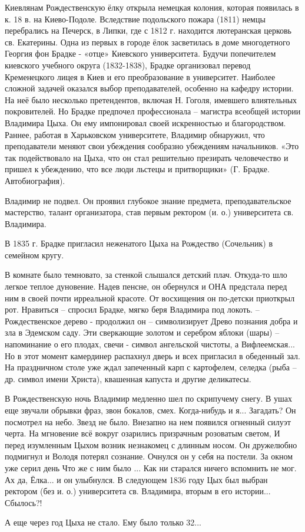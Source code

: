 Киевлянам Рождественскую ёлку открыла немецкая колония, которая появилась в к.
18 в. на Киево-Подоле. Вследствие подольского пожара (1811) немцы перебрались
на Печерск, в Липки, где с 1812 г. находится лютеранская церковь св. Екатерины.
Одна из первых в городе ёлок засветилась в доме многодетного Георгия фон Брадке
-  «отце» Киевского университета. Будучи попечителем киевского учебного округа
(1832-1838), Брадке организовал перевод Кременецкого лицея в Киев и его
преобразование в университет. Наиболее сложной задачей оказался выбор
преподавателей, особенно на кафедру истории. На неё было несколько
претендентов, включая Н. Гоголя, имевшего влиятельных покровителей. Но Брадке
предпочел профессионала – магистра всеобщей истории Владимира Цыха. Он ему
импонировал своей искренностью и благородством. Раннее, работая в Харьковском
университете, Владимир обнаружил, что преподаватели меняют свои убеждения
сообразно убеждениям начальников. «Это так подействовало на Цыха, что он стал
решительно презирать человечество и пришел к убеждению, что все люди льстецы и
притворщики» (Г. Брадке. Автобиография). 

Владимир не подвел. Он проявил глубокое знание предмета, преподавательское
мастерство, талант организатора, став первым ректором (и. о.) университета св.
Владимира. 

В 1835 г.  Брадке пригласил неженатого Цыха на Рождество (Сочельник) в семейном
кругу.

В комнате было темновато, за стенкой слышался детский плач.  Откуда-то шло
легкое теплое дуновение. Надев пенсне, он обернулся и ОНА предстала перед ним в
своей почти ирреальной красоте. От восхищения он по-детски приоткрыл рот.
Нравиться – спросил Брадке, мягко беря Владимира под локоть. – Рождественское
дерево - продолжил он – символизирует Древо познания добра и зла в Эдемском
саду. Эти сверкающие золотом и серебром яблоки (шары) – напоминание о его
плодах, свечи - символ ангельской чистоты, а Вифлеемская...   Но в этот момент
камердинер распахнул дверь и всех пригласил в обеденный зал. На праздничном
столе уже ждал запеченный карп с картофелем, селедка (рыба – др. символ имени
Христа), квашенная капуста и другие деликатесы. 

В Рождественскую ночь Владимир медленно шел по скрипучему снегу. В ушах еще
звучали обрывки фраз, звон бокалов, смех. Когда-нибудь и я... Загадать? Он
посмотрел на небо. Звезд не было. Внезапно на нем появился огненный силуэт
черта. На мгновение всё вокруг озарились призрачным розоватым светом, И перед
изумленным Цыхом возник незнакомец с длинным носом. Он дружелюбно подмигнул и
Володя потерял сознание. Очнулся он у себя на постели. За окном уже серил день
Что же с ним было ... Как ни старался ничего вспомнить не мог. Ах да, Ёлка... и он
улыбнулся. В следующем 1836 году Цых был выбран ректором (без и. о.)
университета св. Владимира, вторым в его истории... Сбылось?!

А еще через год Цыха не стало. Ему было только 32...

